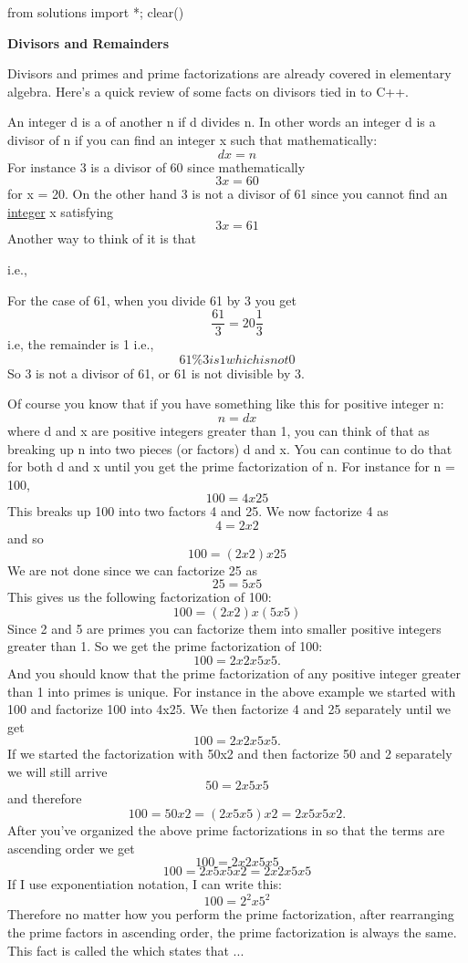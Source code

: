 \begin{python0}
from solutions import *; clear()
\end{python0}

\textbf{{Divisors and Remainders}}

Divisors and primes and prime factorizations are already covered in
elementary algebra. Here's a quick review of some facts on divisors tied
in to C++.

An integer d is a  of another n if d divides n. In other words an integer d is a divisor of n if you can find an integer x such that mathematically:
\[dx = n\]
For instance 3 is a divisor of 60 since mathematically
\[3x = 60\]
for x = 20. On the other hand 3 is not a divisor of 61 since you cannot find an \underline{integer} x satisfying
\[3x = 61\]
Another way to think of it is that


i.e.,


For the case of 61, when you divide 61 by 3 you get
\[\frac{61}{3} = 20\frac{1}{3}\]
i.e, the remainder is 1 i.e.,
\[61 \% 3 is 1 which is not 0\]
So 3 is not a divisor of 61, or 61 is not divisible by 3.

%
%
%

Of course you know that if you have something like this for positive
integer n:
\[n = dx\]
where d and x are positive integers greater than 1, you can think of that
as breaking up n into two pieces (or factors) d and x. You can continue to
do that for both d and x until you get the prime factorization of n. For
instance for n = 100,
\[100 = 4 x 25\]
This breaks up 100 into two factors 4 and 25. We now factorize 4 as
\[4 = 2x2\]
and so
\[100 = (2x2)x25\]
We are not done since we can factorize 25 as
\[25 = 5x5\]
This gives us the following factorization of 100:
\[100 = (2x2)x(5x5)\]
Since 2 and 5 are primes you can factorize them into smaller positive
integers greater than 1. So we get the prime factorization of 100:
\[100 = 2x2x5x5.\]
And you should know that the prime factorization of any positive integer
greater than 1 into primes is unique. For instance in the above example
we started with 100 and factorize 100 into 4x25. We then factorize 4 and
25 separately until we get
\[100 = 2x2x5x5.\]
If we started the factorization with 50x2 and then factorize 50 and 2
separately we will still arrive
\[50 = 2x5x5\]
and therefore
\[100 = 50x2 = (2x5x5)x2 = 2x5x5x2.\]
After you've organized the above prime factorizations in so that the terms
are ascending order we get
\[100 = 2x2x5x5\]
\[100 = 2x5x5x2 = 2x2x5x5\]
If I use exponentiation notation, I can write this:
\[100 = 2^2 x 5^2\]
Therefore no matter how you perform the prime factorization, after
rearranging the prime factors in ascending order, the prime factorization
is always the same. This fact is called the  which states that ...

